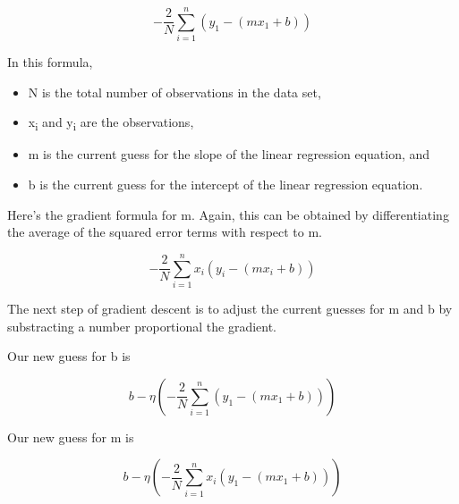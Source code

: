 \documentclass[11pt]{article}
\begin{document}
$$
-\frac{2}{N} \sum_{i=1}^n (y_1 - (mx_1 + b))
$$

In this formula,

\begin{itemize}
\item N is the total number of observations in the data set,

\item x\textsubscript{i} and y\textsubscript{i} are the observations,

\item m is the current guess for the slope of the linear regression equation, and

\item b is the current guess for the intercept of the linear regression equation.
\end{itemize}

Here's the gradient formula for m. Again, this can be obtained by differentiating the average of the squared error terms with respect to m.

$$
-\frac{2}{N} \sum_{i=1}^n x_i(y_i - (mx_i + b))
$$

The next step of gradient descent is to adjust the current guesses for m and b by substracting a number proportional the gradient.

Our new guess for b is

$$
b - \eta \left ( -\frac{2}{N} \sum_{i=1}^n (y_1 - (mx_1 + b)) \right )
$$

Our new guess for m is

$$
b - \eta \left ( -\frac{2}{N} \sum_{i=1}^n x_i(y_1 - (mx_1 + b)) \right )
$$
\end{document}
